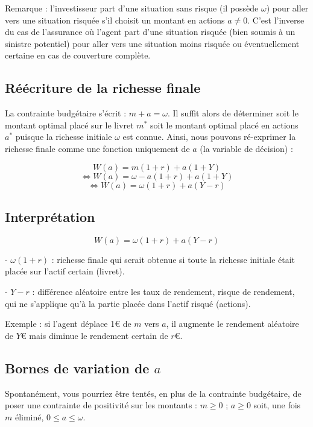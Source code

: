 \documentclass[a4paper, 12pt]{report}
\begin{document}
Remarque : l'investisseur part d'une situation sans risque (il possède \( \omega \)) pour aller vers une situation risquée s'il choisit un montant en actions \( a \neq 0 \). C'est l'inverse du cas de l'assurance où l'agent part d'une situation risquée (bien soumis à un sinistre potentiel) pour aller vers une situation moins risquée ou éventuellement certaine en cas de couverture complète.

\subsection{Réécriture de la richesse finale}

La contrainte budgétaire s'écrit : \( m + a = \omega \). Il suffit alors de déterminer soit le montant optimal placé sur le livret \( m^* \) soit le montant optimal placé en actions \( a^* \) puisque la richesse initiale \( \omega \) est connue. Ainsi, nous pouvons ré-exprimer la richesse finale comme une fonction uniquement de \( a \) (la variable de décision) :

\[W(a) = m (1 + r) + a (1 + Y) \]
\[ \Leftrightarrow W(a) = \omega - a (1 + r) + a (1 + Y) \] 
\[ \Leftrightarrow W(a) = \omega (1 + r) + a (Y - r) \]

\subsection{Interprétation}

\[
W(a) = \omega (1 + r) + a (Y - r)
\]

- \( \omega (1 + r) \) : richesse finale qui serait obtenue si toute la richesse initiale était placée sur l'actif certain (livret).

- \( Y - r \) : différence aléatoire entre les taux de rendement, risque de rendement, qui ne s'applique qu'à la partie placée dans l'actif risqué (actions).

Exemple : si l'agent déplace 1€ de \( m \) vers \( a \), il augmente le rendement aléatoire de \( Y \)€ mais diminue le rendement certain de \( r \)€.

\subsection{Bornes de variation de \( a \)}

Spontanément, vous pourriez être tentés, en plus de la contrainte budgétaire, de poser une contrainte de positivité sur les montants : \( m \geq 0 \) ; \( a \geq 0 \) soit, une fois \( m \) éliminé, \( 0 \leq a \leq \omega \).
\end{document}
